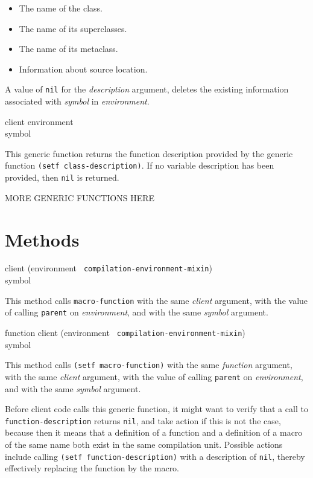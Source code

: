 \begin{itemize}
\item The name of the class.
\item The name of its superclasses.
\item The name of its metaclass.
\item Information about source location.
\end{itemize}

A value of \texttt{nil} for the \textit{description} argument, deletes
the existing information associated with \textit{symbol} in
\textit{environment}.

 {client environment \\ symbol}

This generic function returns the function description provided by the
generic function \texttt{(setf class-description)}.  If no variable
description has been provided, then \texttt{nil} is returned.

MORE GENERIC FUNCTIONS HERE

\section{Methods}

{\small{} {client (environment {\tt
      compilation-environment-mixin}) \\ symbol}
}

This method calls \texttt{macro-function} with the same
\textit{client} argument, with the value of calling \texttt{parent} on
\textit{environment}, and with the same \textit{symbol} argument.

{\small{} {function client (environment {\tt
      compilation-environment-mixin}) \\ symbol}
}

This method calls \texttt{(setf macro-function)} with the same
\textit{function} argument, with the same \textit{client} argument, with
the value of calling \texttt{parent} on \textit{environment}, and with
the same \textit{symbol} argument.

Before client code calls this generic function, it might want to
verify that a call to \texttt{function-description} returns
\texttt{nil}, and take action if this is not the case, because then it
means that a definition of a function and a definition of a macro of
the same name both exist in the same compilation unit.  Possible
actions include calling \texttt{(setf function-description)} with a
description of \texttt{nil}, thereby effectively replacing the
function by the macro.

